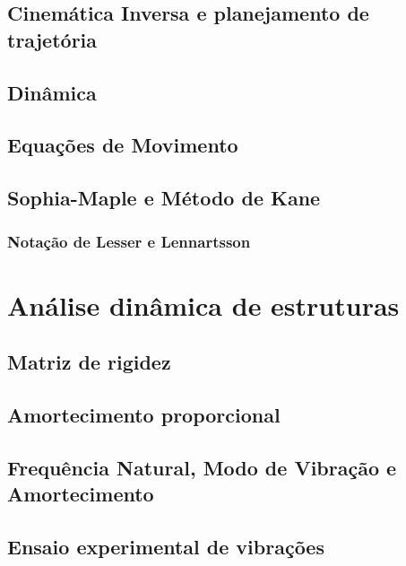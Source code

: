 \subsection{Cinemática Inversa e planejamento de
trajetória}\label{sec::ikin_traj}

\subsection{Dinâmica}

\subsection{Equações de Movimento}

\subsection{Sophia-Maple e Método de Kane}\label{sec::sophia-kane}

\subsubsection{Notação de Lesser e Lennartsson}


\section{Análise dinâmica de estruturas}

\subsection{Matriz de rigidez} \label{sec::rigidez}

\subsection{Amortecimento proporcional} \label{sec::amortecimento}

\subsection{Frequência Natural, Modo de Vibração e Amortecimento}
\label{sec::param_mod}

\subsection{Ensaio experimental de vibrações}


